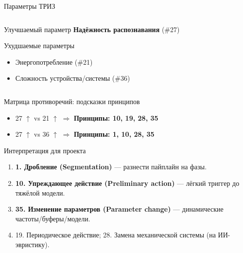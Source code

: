 \documentclass[aspectratio=169]{beamer}
\begin{document}
\begin{frame}{Параметры ТРИЗ}
    \begin{columns}[T,onlytextwidth]
      \begin{column}{0.45\textwidth}
        \begin{block}{Улучшаемый параметр}
          \textbf{Надёжность распознавания} (\#27)
        \end{block}
        \begin{block}{Ухудшаемые параметры}
          \begin{itemize}
            \item Энергопотребление (\#21)
            \item Сложность устройства/системы (\#36)
          \end{itemize}
        \end{block}
      \end{column}
      \begin{column}{0.55\textwidth}
        \centering
      \end{column}
    \end{columns}
\end{frame}

\begin{frame}{Матрица противоречий: подсказки принципов}
  \begin{itemize}
    \item 27 $\uparrow$ vs 21 $\uparrow$ \(\Rightarrow\) \textbf{Принципы: 10, 19, 28, 35}
    \item 27 $\uparrow$ vs 36 $\uparrow$ \(\Rightarrow\) \textbf{Принципы: 1, 10, 28, 35}
  \end{itemize}
  \bigskip
  \begin{block}{Интерпретация для проекта}
  \begin{enumerate}
    \item \textbf{1. Дробление (Segmentation)} — разнести пайплайн на фазы.
    \item \textbf{10. Упреждающее действие (Preliminary action)} — лёгкий триггер до тяжёлой модели.
    \item \textbf{35. Изменение параметров (Parameter change)} — динамические частоты/буферы/модели.
    \item 19. Периодическое действие; 28. Замена механической системы (на ИИ-эвристику).
  \end{enumerate}
  \end{block}
  \end{frame}
\end{document}
